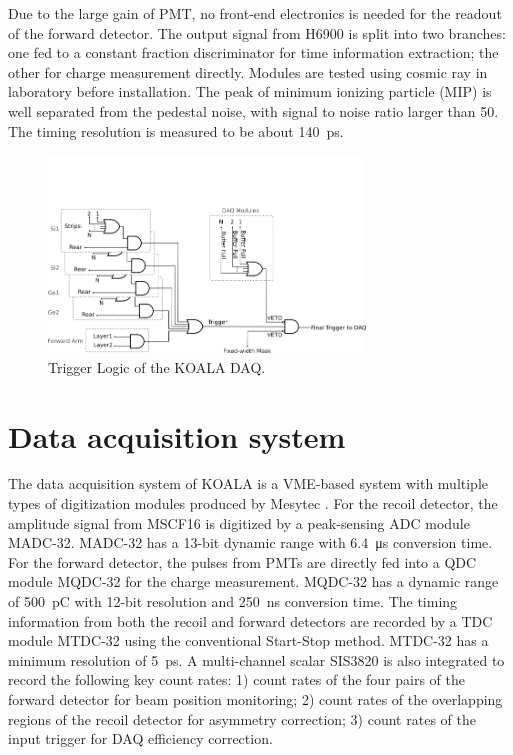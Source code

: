 \documentclass[number,5p]{elsarticle}
\begin{document}
Due to the large gain of PMT, no front-end electronics is needed for the readout of the forward detector.
The output signal from H6900 is split into two branches: one fed to a
constant fraction discriminator for time information extraction; the other for charge measurement directly.
Modules are tested using cosmic ray in laboratory before installation.
The peak of minimum ionizing particle (MIP) is well separated from the pedestal noise, with signal to noise ratio larger than 50.
The timing resolution is measured to be about \SI{140}{\pico\second}.

\begin{figure}[htbp]
  \centering
  \includegraphics[width=0.75\textwidth]{./trigger_logic.png}
  \caption{Trigger Logic of the KOALA DAQ.}
  \label{fig:trigger_logic}
\end{figure}

\section{Data acquisition system}
\label{sec:daq}

The data acquisition system of KOALA is a VME-based system with multiple types
of digitization modules produced by Mesytec \cite{mesytec}.
For the recoil detector, the amplitude signal from MSCF16 is digitized by a
peak-sensing ADC module MADC-32.
MADC-32 has a 13-bit dynamic range with \SI{6.4}{\micro\second} conversion time.
For the forward detector, the pulses from PMTs are directly fed into a QDC
module MQDC-32 for the charge measurement.
MQDC-32 has a dynamic range of \SI{500}{\pico\coulomb} with 12-bit resolution
and \SI{250}{\nano\second} conversion time.
The timing information from both the recoil and forward detectors are recorded by a TDC module MTDC-32 using the conventional Start-Stop method.
MTDC-32 has a minimum resolution of \SI{5}{\pico\second}.
A multi-channel scalar SIS3820 \cite{sis} is also integrated to record
the following key count rates: 1) count rates of the four pairs of the forward detector for beam position monitoring; 2) count rates of the overlapping regions of the recoil detector for asymmetry correction; 3) count rates of the input trigger
for DAQ efficiency correction.
\end{document}
